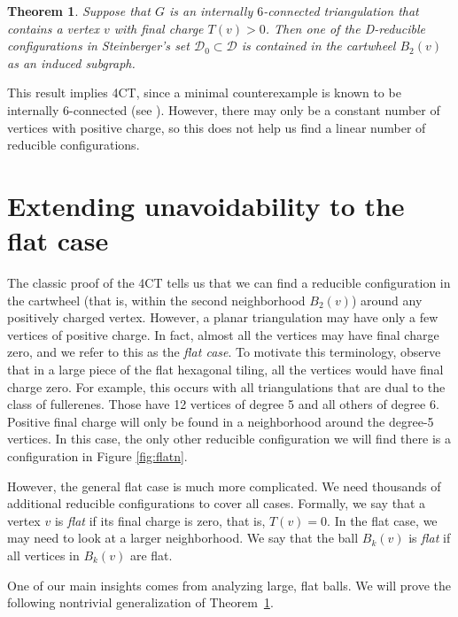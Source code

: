 \documentclass[10pt,a4paper]{article}
\newtheorem{thm}{Theorem}[section]
\def\cD{{\mathcal D}}
\def\showlabel#1{}
\begin{document}
\begin{thm}
\label{thm:T(v)> 0}\showlabel{T(v)> 0}
Suppose that $G$ is an internally $6$-connected triangulation that contains a vertex $v$ with final charge $T(v) > 0$. Then one of the D-reducible configurations 
in Steinberger's \cite{steinberger2010unavoidable} set $\mathcal{D}_0\subset \cD$ is contained in the cartwheel $B_2(v)$ as an induced subgraph. 
\end{thm}

This result implies 4CT, since a minimal counterexample is known to be internally 6-connected (see \cite{RSST,RSST-STOC}). However, there may only be a constant number of vertices with
positive charge, so this does not help us find a linear number of reducible configurations.


\section{Extending unavoidability to the flat case}

The classic proof of the 4CT tells us that we can find a reducible configuration in the cartwheel (that is, within the second neighborhood $B_2(v)$) around any positively charged vertex. However, a planar triangulation may have only a few vertices of positive charge. In fact, almost all the vertices may have final charge zero, and we refer to this as the \emph{flat case}. To motivate this terminology, observe that in a large piece of the flat hexagonal tiling, all the vertices would have final charge zero. For example, this occurs with all triangulations that are dual to the class of fullerenes. Those have 12 vertices of degree 5 and all others of degree 6. Positive final charge will only be found in a neighborhood around the degree-5 vertices. In this case, the only other reducible configuration we will find there is a configuration in Figure \ref{fig:flatn}. 

However, the general flat case is much more complicated. We need thousands of additional reducible configurations to cover all cases. Formally, we say that a vertex $v$ is \emph{flat} if its final charge is zero, that is, $T(v)=0$. 
In the flat case, we may need to look at a larger neighborhood. 
We say that the ball $B_k(v)$ is \emph{flat} if all vertices in $B_k(v)$ are flat.

One of our main insights comes from analyzing large, flat balls. We will prove the following nontrivial generalization of Theorem~\ref{thm:T(v)> 0}.
\end{document}
